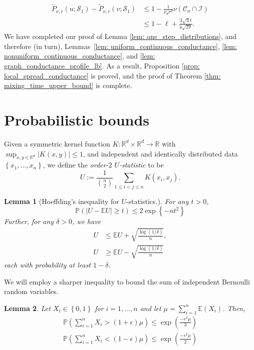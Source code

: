 \documentclass[11pt,twoside]{article}
\newtheorem{lemma}{Lemma}
\newcommand{\set}[1]{\left\{#1\right\}}
\newcommand{\abs}[1]{\left \lvert #1 \right \rvert}
\newcommand{\Reals}{\mathbb{R}}
\newcommand{\Rd}{\Reals^d}
\newcommand{\1}{\mathbf{1}}
\newcommand{\Pbb}{\mathbb{P}}
\newcommand{\Ebb}{\mathbb{E}}
\newcommand{\Sset}{\mathcal{S}}
\newcommand{\Cset}{\mathcal{C}}
\newcommand{\Csig}{\Cset_{\sigma}}
\begin{document}
\begin{align*}
\widetilde{P}_{\nu,r}(u; \Sset_1) - \widetilde{P}_{\nu,r}(v; \Sset_1) & \leq  1 - \frac{1}{\nu_d r^d} \nu(\Csig \cap \mathcal{I}) \\
& \leq 1 - \ell + \frac{3 \sqrt{3} t}{4\sqrt{2\pi}}.
\end{align*}
We have completed our proof of Lemma \ref{lem: one_step_distributions}, and therefore (in turn), Lemmas~\ref{lem: uniform_continuous_conductance}, \ref{lem: nonuniform_continuous_conductance}, and \ref{lem: graph_conductance_profile_lb}. As a result, Proposition \ref{prop: local_spread_conductance} is proved, and the proof of Theorem \ref{thm: mixing_time_upper_bound} is complete.

\section{Probabilistic bounds}
\label{sec: concentration}

Given a symmetric kernel function $K: \Rd \times \Rd \to \Reals$ with $\sup_{x,y \in \Rd} \abs{K(x,y)} \leq 1$, and independent and identically distributed data $\set{x_1, \ldots, x_n}$, we define the \textit{order-$2$ $U$-statistic} to be 
\begin{equation*}
U := \frac{1}{ {n \choose 2} } \sum_{1 \leq i < j \leq n} K(x_i,x_j).
\end{equation*}

\begin{lemma}[Hoeffding's inequality for $U$-statistics.]
	\label{lem: bounded_difference}
	For any $t > 0$,
	\begin{equation*}
	\mathbb{P}(\abs{U - \mathbb{E}U} \geq t) \leq 2 \exp\left\{-nt^2\right\}
	\end{equation*}
	Further, for any $\delta > 0$, we have
	\begin{align*}
	U & \leq \mathbb{E}U + \sqrt{\frac{\log(1 / \delta)}{n} }, \\
	U & \geq \mathbb{E}U - \sqrt{\frac{\log(1 / \delta)}{n} }
	\end{align*}
	each with probability at least $1 - \delta$. 
\end{lemma}

We will employ a sharper inequality to bound the sum of independent Bernoulli random variables.
\begin{lemma}
	\label{lem: multiplicative_Hoeffding}
	Let $X_i \in \set{0,1}$ for $i = 1, \ldots, n$ and let $\mu = \sum_{i = 1}^n \Ebb(X_i)$. Then,
	\begin{align*}
	\Pbb\left(\sum_{i=1}^{n}X_i > (1 + \epsilon) \mu \right) \leq \exp \left(\frac{-\epsilon^2 \mu}{3}\right) \\
	\Pbb\left(\sum_{i=1}^{n}X_i < (1 - \epsilon) \mu \right) \leq \exp \left(\frac{-\epsilon^2 \mu}{2}\right)
	\end{align*}
\end{lemma}
\end{document}
